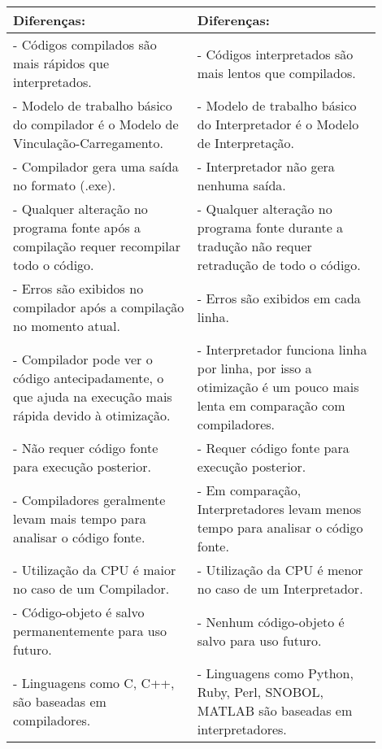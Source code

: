 \documentclass[12pt,a4paper]{abntex2}
\begin{document}
\begin{tabular}{|p{0.45\linewidth}|p{0.45\linewidth}|}
\textbf{Diferenças:} & \textbf{Diferenças:} \\
\hline
- Códigos compilados são mais rápidos que interpretados.
& - Códigos interpretados são mais lentos que compilados. \\
\hline
- Modelo de trabalho básico do compilador é o Modelo de Vinculação-Carregamento.
& - Modelo de trabalho básico do Interpretador é o Modelo de Interpretação. \\
\hline
- Compilador gera uma saída no formato (.exe).
& - Interpretador não gera nenhuma saída. \\
\hline
- Qualquer alteração no programa fonte após a compilação requer recompilar todo o código.
& - Qualquer alteração no programa fonte durante a tradução não requer retradução de todo o código. \\
\hline
- Erros são exibidos no compilador após a compilação no momento atual.
& - Erros são exibidos em cada linha. \\
\hline
- Compilador pode ver o código antecipadamente, o que ajuda na execução mais rápida devido
à otimização. & - Interpretador funciona linha por linha, por isso a otimização é um pouco
mais lenta em comparação com compiladores. \\
\hline
- Não requer código fonte para execução posterior.
& - Requer código fonte para execução posterior. \\
\hline
- Compiladores geralmente levam mais tempo para analisar o código fonte.
& - Em comparação, Interpretadores levam menos tempo para analisar o código fonte. \\
\hline
- Utilização da CPU é maior no caso de um Compilador.
& - Utilização da CPU é menor no caso de um Interpretador. \\
\hline
- Código-objeto é salvo permanentemente para uso futuro.
& - Nenhum código-objeto é salvo para uso futuro. \\
\hline
- Linguagens como C, C++, são baseadas em compiladores.
& - Linguagens como Python, Ruby, Perl, SNOBOL, MATLAB são baseadas em interpretadores. \\
\hline
\end{tabular}

\end{document}
